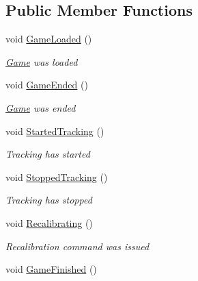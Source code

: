 \subsection*{Public Member Functions}
\begin{DoxyCompactItemize}
\item 
void \mbox{\hyperlink{interface_chess_tracking_1_1_controlling_elements_1_1_program_state_1_1_i_program_state_afaaa62756391f219e5318342f9bb568a}{Game\+Loaded}} ()
\begin{DoxyCompactList}\small\item\em \mbox{\hyperlink{namespace_chess_tracking_1_1_game}{Game}} was loaded \end{DoxyCompactList}\item 
void \mbox{\hyperlink{interface_chess_tracking_1_1_controlling_elements_1_1_program_state_1_1_i_program_state_afb709d1cfd4782712e5e23e54fc3ad28}{Game\+Ended}} ()
\begin{DoxyCompactList}\small\item\em \mbox{\hyperlink{namespace_chess_tracking_1_1_game}{Game}} was ended \end{DoxyCompactList}\item 
void \mbox{\hyperlink{interface_chess_tracking_1_1_controlling_elements_1_1_program_state_1_1_i_program_state_a6c68e5ce7c334b28439ae9bdc7462e8d}{Started\+Tracking}} ()
\begin{DoxyCompactList}\small\item\em Tracking has started \end{DoxyCompactList}\item 
void \mbox{\hyperlink{interface_chess_tracking_1_1_controlling_elements_1_1_program_state_1_1_i_program_state_aa8c051432b41c20be372d050635d84af}{Stopped\+Tracking}} ()
\begin{DoxyCompactList}\small\item\em Tracking has stopped \end{DoxyCompactList}\item 
void \mbox{\hyperlink{interface_chess_tracking_1_1_controlling_elements_1_1_program_state_1_1_i_program_state_ab429b32115bb96d9a91e3966c12096a9}{Recalibrating}} ()
\begin{DoxyCompactList}\small\item\em Recalibration command was issued \end{DoxyCompactList}\item 
void \mbox{\hyperlink{interface_chess_tracking_1_1_controlling_elements_1_1_program_state_1_1_i_program_state_a5c438d1bd53a0dd168eb56e20c482c1f}{Game\+Finished}} ()

\end{DoxyCompactItemize}
